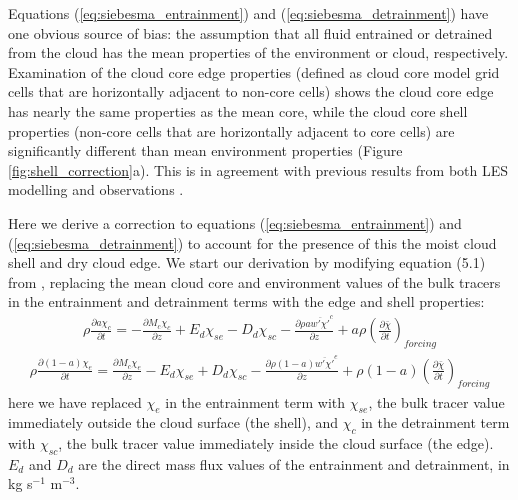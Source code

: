 \documentclass[draft,grl]{agutex}
\begin{document}
\begin{article}
Equations (\ref{eq:siebesma_entrainment}) and (\ref{eq:siebesma_detrainment}) 
have one obvious source of bias: the assumption that all fluid entrained or 
detrained from the cloud has the mean properties of the environment or cloud, 
respectively.  Examination of the cloud core edge properties (defined as cloud 
core model grid cells that are horizontally adjacent to non-core cells) shows 
the cloud core edge has nearly the same properties as the mean core, while the 
cloud core shell properties (non-core cells that are horizontally adjacent to 
core cells) are significantly different than mean environment properties 
(Figure \ref{fig:shell_correction}a).  This is in agreement with previous 
results from both LES modelling and observations \citep{Heus2008}.
  
Here we derive a correction to equations (\ref{eq:siebesma_entrainment}) and 
(\ref{eq:siebesma_detrainment}) to account for the presence of this the moist 
cloud shell and dry cloud edge.  We start our derivation by modifying equation 
(5.1) from \cite{Siebesma1995}, replacing the mean cloud core and environment 
values of the bulk tracers in the entrainment and detrainment terms with the 
edge and shell properties:
\begin{eqnarray}
  \label{eq:entrainment_derivation_1}
    \rho \frac{\partial a \chi_c}{\partial t} 
    = - \frac{\partial M_c \chi_c}{\partial z} 
    + E_d \chi_{se} - D_d \chi_{sc} 
    - \frac{\partial \rho a \overline{w' \chi'}^c}{\partial z} 
    + a \rho \left(\frac{\partial \bar{\chi}}{\partial t}\right)_{forcing}
\end{eqnarray}
\begin{eqnarray}
  \label{eq:detrainment_derivation_1}
    \rho \frac{\partial (1 - a) \chi_e}{\partial t}
    = \frac{\partial M_c \chi_e}{\partial z} 
    - E_d \chi_{se} + D_d \chi_{sc} 
    - \frac{\partial \rho (1 - a) \overline{w' \chi'}^e}{\partial z} 
    + \rho (1 - a) \left(\frac{\partial \bar{\chi}}{\partial t}\right)_{forcing}
\end{eqnarray}
here we have replaced $\chi_e$ in the entrainment term with $\chi_{se}$, the 
bulk tracer value immediately outside the cloud surface (the shell), and 
$\chi_c$ in the detrainment term with $\chi_{sc}$, the bulk tracer value 
immediately inside the cloud surface (the edge).  $E_d$ and $D_d$ are the 
direct mass flux values of the entrainment and detrainment, in kg s$^{-1}$ 
m$^{-3}$.


\end{article}
\end{document}

